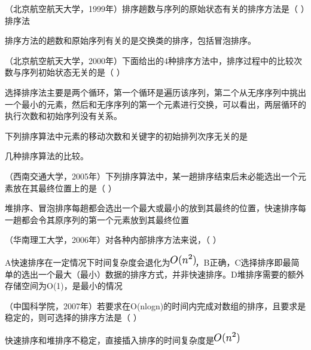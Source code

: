 \question （北京航空航天大学，1999年）排序趟数与序列的原始状态有关的排序方法是（
）排序法
\par{}
\begin{solution}排序方法的趟数和原始序列有关的是交换类的排序，包括冒泡排序。
\end{solution}
\question （北京航空航天大学，2000年）下面给出的4种排序方法中，排序过程中的比较次数与序列初始状态无关的是（
）
\par{}
\begin{solution}选择排序法主要是两个循环，第一个循环是遍历该序列，第二个从无序序列中挑出一个最小的元素，然后和无序序列的第一个元素进行交换，可以看出，两层循环的执行次数和初始序列没有关系。
\end{solution}
\question 下列排序算法中元素的移动次数和关键字的初始排列次序无关的是
\par{}
\begin{solution}几种排序算法的比较。
\end{solution}
\question （西南交通大学，2005年）下列排序算法中，某一趟排序结束后未必能选出一个元素放在其最终位置上的是（
）
\par{}
\begin{solution}堆排序、冒泡排序每趟都会选出一个最大或最小的放到其最终的位置，快速排序每一趟都会令其原序列的第一个元素放到其最终位置
\end{solution}
\question （华南理工大学，2006年）对各种内部排序方法来说，（ ）
\par{}
\begin{solution}A快速排序在一定情况下时间复杂度会退化为\includegraphics[width=0.43750in,height=0.19792in]{texmath/ead2f65Cdpi7B3507DO28n5E229}，B正确，C选择排序即最简单的选出一个最大（最小）数据的排序方式，并非快速排序。D堆排序需要的额外存储空间为O(1)，是最小的情况
\end{solution}
\question （中国科学院，2007年）若要求在O(nlogn)的时间内完成对数组的排序，且要求是稳定的，则可选择的排序方法是（
）
\par{}
\begin{solution}快速排序和堆排序不稳定，直接插入排序的时间复杂度是\includegraphics[width=0.43750in,height=0.19792in]{texmath/ead2f65Cdpi7B3507DO28n5E229}
\end{solution}

